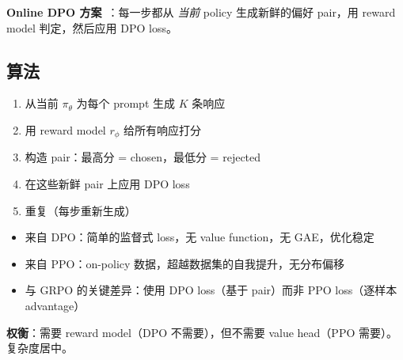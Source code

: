 \textbf{Online DPO 方案}~\cite{guo2024direct}：每一步都从 \emph{当前} policy 生成新鲜的偏好 pair，用 reward model 判定，然后应用 DPO loss。

\subsection{算法}
\label{algorithm-dup2}

\begin{enumerate}
  \item 从当前 $\pi_\theta$ 为每个 prompt 生成 $K$ 条响应
  \item 用 reward model $r_\phi$ 给所有响应打分
  \item 构造 pair：最高分 = chosen，最低分 = rejected
  \item 在这些新鲜 pair 上应用 DPO loss
  \item 重复（每步重新生成）
\end{enumerate}

\begin{intuitionbox}[Online DPO = 两全其美]
\begin{itemize}
  \item 来自 DPO：简单的监督式 loss，无 value function，无 GAE，优化稳定
  \item 来自 PPO：on-policy 数据，超越数据集的自我提升，无分布偏移
  \item 与 GRPO 的关键差异：使用 DPO loss（基于 pair）而非 PPO loss（逐样本 advantage）
\end{itemize}

\textbf{权衡}：需要 reward model（DPO 不需要），但不需要 value head（PPO 需要）。复杂度居中。
\end{intuitionbox}


